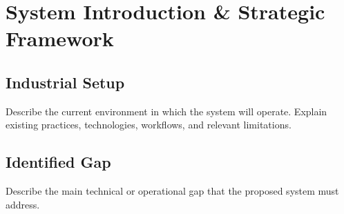 
\section{System Introduction \& Strategic Framework}

\subsection{Industrial Setup}

Describe the current environment in which the system will operate.
Explain existing practices, technologies, workflows, and relevant limitations.
\subsection{Identified Gap}

Describe the main technical or operational gap that the proposed system must address.
